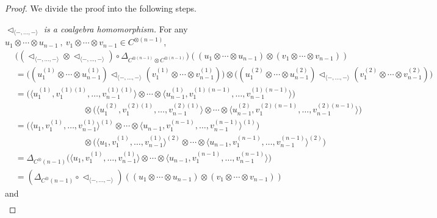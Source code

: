 \documentclass[a4paper,reqno,10pt]{amsart}
\theoremstyle{plain}
\theoremstyle{definition}
\theoremstyle{remark}
\begin{document}
\begin{proof} We divide the proof into the following steps.

   {\em $\triangleleft_{\langle -, \ldots, - \rangle } $ is a coalgebra homomorphism.} For any $u_1 \otimes \cdots \otimes u_{n-1} ~\! , ~ \! v_1 \otimes \cdots \otimes v_{n-1} \in C^{\otimes (n-1)}$,
     \begin{align*}
       & \big( (\triangleleft_{\langle -, \ldots , - \rangle } \otimes \triangleleft_{\langle -, \ldots , - \rangle }) \circ \Delta_{C^{\otimes (n-1)} \otimes C^{\otimes (n-1)}} \big) ((u_1 \otimes \cdots \otimes u_{n-1}) \otimes (v_1 \otimes \cdots \otimes v_{n-1})) \\
        &= \big( (u_1^{(1)} \otimes \cdots \otimes u_{n-1}^{(1)}) \triangleleft_{\langle -, \ldots , - \rangle } (v_1^{(1)} \otimes \cdots \otimes v_{n-1}^{(1)}) \big) \otimes \big( (u_1^{(2)} \otimes \cdots \otimes u_{n-1}^{(2)}) \triangleleft_{\langle -, \ldots , - \rangle } (v_1^{(2)} \otimes \cdots \otimes v_{n-1}^{(2)}) \big) \\
        &= \big(  \langle u_1^{(1)} , v_1^{(1)(1)} , \ldots, v_{n-1}^{(1)(1)} \rangle \otimes \cdots \otimes \langle u_{n-1}^{(1)} , v_1^{(1)(n-1)} , \ldots, v_{n-1}^{(1)(n-1)} \rangle  \big) \\
        & \qquad \qquad \qquad \qquad \otimes \big(  \langle u_1^{(2)} , v_1^{(2)(1)} , \ldots, v_{n-1}^{(2)(1)} \rangle \otimes \cdots \otimes  \langle u_{n-1}^{(2)} , v_1^{(2)(n-1)} , \ldots, v_{n-1}^{(2)(n-1)} \rangle  \big) \\
        &= \big(   \langle u_1, v_1^{(1)}, \ldots, v_{n-1}^{(1)} \rangle^{(1)} \otimes \cdots \otimes \langle  u_{n-1}, v_1^{(n-1)}, \ldots, v_{n-1}^{(n-1)}  \rangle^{(1)} \big) \\
        & \qquad \qquad \qquad \qquad \otimes \big(   \langle u_1, v_1^{(1)}, \ldots, v_{n-1}^{(1)} \rangle^{(2)} \otimes \cdots \otimes \langle  u_{n-1}, v_1^{(n-1)}, \ldots, v_{n-1}^{(n-1)}  \rangle^{(2)}    \big) \\
        &= \Delta_{C^\otimes (n-1)} \big(   \langle u_1, v_1^{(1)}, \ldots, v_{n-1}^{(1)} \rangle \otimes \cdots \otimes  \langle u_{n-1}, v_1^{(n-1)}, \ldots, v_{n-1}^{(n-1)} \rangle \big) \\
        &= (\Delta_{C^\otimes (n-1)} \circ \triangleleft_{\langle -, \ldots , - \rangle }) ((u_1 \otimes \cdots \otimes u_{n-1}) \otimes (v_1 \otimes \cdots \otimes v_{n-1}))
     \end{align*}
     and
     \begin{align*}

\end{align*}
\end{proof}
\end{document}
